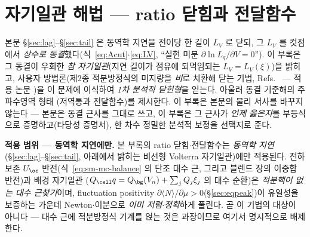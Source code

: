 \setcounter{section}{4}
\section{자기일관 해법 --- ratio 닫힘과 전달함수}\label{sec:appendix-selfconsistent}
본문 \S\ref{sec:lag}--\S\ref{sec:tail} 은 동역학 지연을 전이당 한 길이 $L_V$ 로 닫되, 그 $L_V$ 를 컷점에서
\emph{상수로 동결}했다(식~\eqref{eq:Acut}$\cdot$\eqref{eq:LV}, ``실현 미분 $\partial\ln L_q/\partial V=0$''). 이 부록은
그 동결이 우회한 \emph{참 자기일관}(지연 길이가 점유에 되먹임되는 $L_V=L_V(\xi)$)을 밝히고, 사용자 방법론(제2종
적분방정식의 미지량을 \emph{비}로 치환해 닫는 기법, Refs.~\cite{lee2011jcp,son2013jcp} --- 적용 논문
\cite{lee2017jcp})을 이 문제에 이식하여 \emph{1차 분석적 닫힌형}을 얻는다. 아울러 동결 기준해의 주파수영역 형태
(저역통과 전달함수)를 제시한다. 이 부록은 본문의 물리 서사를 바꾸지 않는다 --- 본문은 동결 근사를 그대로 쓰고,
이 부록은 그 근사가 \emph{언제 옳은지}를 부등식으로 증명하고(타당성 증명서), 한 차수 정밀한 분석적 보정을 선택지로 준다.

\begin{warnbox}
\textbf{적용 범위 --- 동역학 지연에만.} 본 부록의 ratio 닫힘$\cdot$전달함수는 \emph{동역학 지연}
(\S\ref{sec:lag}--\S\ref{sec:tail}, 아래에서 밝히는 비선형 Volterra 자기일관)에만 적용된다. 전하 보존
$U_\oc$ 반전(식~\eqref{eq:sm-mc-balance} 의 단조 대수 근, 그리고 블렌드 장의 이중합 반전)과 배경 자기일관
($Q_\cell q=Q_\bg(V_n)+\sum_jQ_j\xi_j$ 의 대수 순환)은 \emph{적분핵이 없는 대수 근찾기}이며, fluctuation positivity
$\partial\langle N\rangle/\partial\mu>0$(\S\ref{sec:eqpeak})이 유일성을 보증하는 가운데 Newton$\cdot$이분으로
\emph{이미 저렴$\cdot$정확}하게 풀린다. 곧 이 기법의 대상이 아니다 --- 대수 근에 적분방정식 기계를 얹는 것은
과장이므로 여기서 명시적으로 배제한다.
\end{warnbox}

